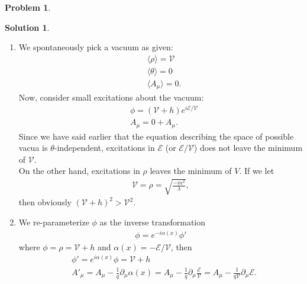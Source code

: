 \documentclass[a4paper,11pt]{article}
\numberwithin{equation}{section}
\theoremstyle{definition}
\newtheorem{prob}{Problem}[section]
\newtheorem{sln}{Solution}[section]
\newcommand{\p}{\partial}
\newcommand{\E}{\mathcal{E}}
\newcommand{\V}{\mathcal{V}}
\begin{document}
\begin{prob}
\begin{sln}
\begin{enumerate}
				
				
				
				
				
				
				
				
				
				
				
				\item We spontaneously pick a vacuum as given:
				\begin{align}
				&\langle \rho \rangle = \V\\
				&\langle \theta \rangle  = 0\\
				&\langle A_\mu \rangle = 0.
				\end{align}
				Now, consider small excitations about the vacuum:
				\begin{align}
				&\phi = (\V+h)e^{i\E/\V}\\
				&A_\mu = 0 + A_\mu.
				\end{align}
				Since we have said earlier that the equation describing the space of possible vacua is $\theta$-independent, excitations in $\E$ (or $\E/\V$) does not leave the minimum of $\V$.\\
				
				On the other hand, excitations in $\rho$ leaves the minimum of $V$. If we let
				\begin{align}
				\V = \rho = \sqrt{\frac{-m^2}{\lambda}},
				\end{align}
				then obviously $(\V+h)^2 > \V^2$.\\
				
				
				
				
				
				
				
				
				
				
				
				
				
				
				
				
				\item We re-parameterize $\phi$ as the inverse transformation
				\begin{align}
				\phi = e^{-i\alpha(x)}\phi'
				\end{align}
				where $\phi = \rho = \V + h$  and $\alpha(x) = -\E/\V$, then
				\begin{align}
				&\phi' = e^{i\alpha(x)}\phi = \V + h\\
				&A'_\mu = A_\mu - \frac{1}{q}\p_\mu\alpha(x) = A_\mu - \frac{1}{q}\p_\mu \frac{\E}{\V} = A_\mu - \frac{1}{q\V}\p_\mu\E.
				\end{align}
				
				
				

\end{enumerate}
\end{sln}
\end{prob}
\end{document}
